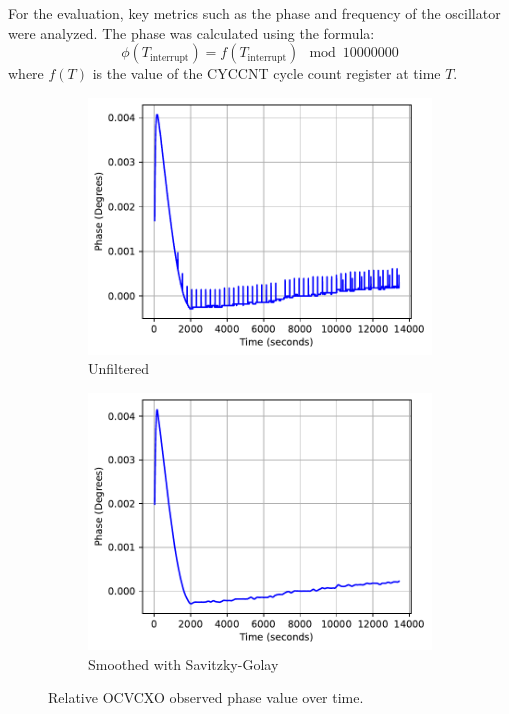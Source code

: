 \documentclass[12pt, a4paper]{extarticle}
\begin{document}
For the evaluation, key metrics such as the phase and frequency of the oscillator were analyzed. The phase was calculated using the formula:
\[
    \phi(T_{\text{interrupt}}) = f(T_{\text{interrupt}}) \mod 10000000
\]
where $f(T)$ is the value of the CYCCNT cycle count register at time $T$.

\begin{figure}[H]
  \centering
  \begin{subfigure}[b]{0.48\textwidth}
    \centering
    \includegraphics[height=0.7\textwidth]{phase-deg-raw.pdf}
    \caption{Unfiltered}
    \label{fig:phase-deg-raw}
  \end{subfigure}
  \hfill
  \begin{subfigure}[b]{0.48\textwidth}
    \centering
    \includegraphics[height=0.7\textwidth]{phase-deg-smooth.pdf}
    \caption{Smoothed with Savitzky-Golay}
    \label{fig:phase-deg-smooth}
  \end{subfigure}
  \captionsetup{width=0.8\textwidth}
  \caption{Relative OCVCXO observed phase value over time.}
  \label{fig:phase-val}
\end{figure}
\end{document}
